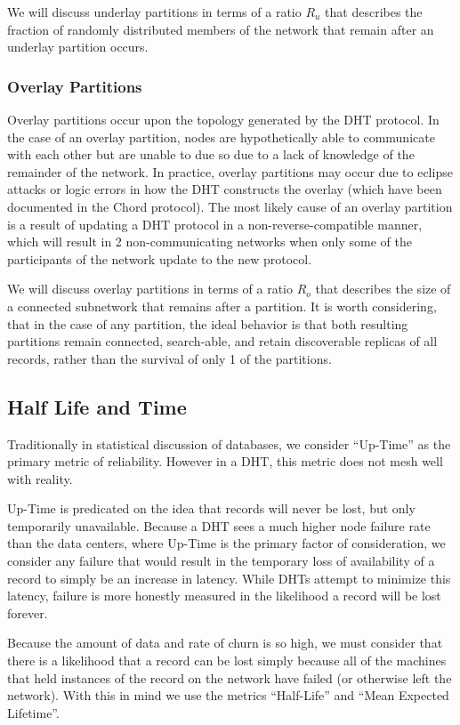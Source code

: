 We will discuss underlay partitions in terms of a ratio $R_{u}$ that describes the fraction of randomly distributed members of the network that remain after an underlay partition occurs. 

\subsubsection{Overlay Partitions}
Overlay partitions occur upon the topology generated by the DHT protocol. 
In the case of an overlay partition, nodes are hypothetically able to communicate with each other but are unable to due so due to a lack of knowledge of the remainder of the network.
In practice, overlay partitions may occur due to eclipse attacks \cite{dhtsec} or logic errors in how the DHT constructs the overlay (which have been documented in the Chord protocol).
The most likely cause of an overlay partition is a result of updating a DHT protocol in a non-reverse-compatible manner, which will result in 2 non-communicating networks when only some of the participants of the network update to the new protocol.

We will discuss overlay partitions in terms of a ratio $R_{o}$ that describes the size of a connected subnetwork that remains after a partition.
It is worth considering, that in the case of any partition, the ideal behavior is that both resulting partitions remain connected, search-able, and retain discoverable replicas of all records, rather than the survival of only 1 of the partitions.

\subsection{Half Life and Time}
Traditionally in statistical discussion of databases, we consider ``Up-Time'' as the primary metric of reliability.
However in a DHT, this metric does not mesh well with reality.

Up-Time is predicated on the idea that records will never be lost, but only temporarily unavailable.
Because a DHT sees a much higher node failure rate than the data centers, where Up-Time is the primary factor of consideration, we consider any failure that would result in the temporary loss of availability of a record to simply be an increase in latency.
While DHTs attempt to minimize this latency, failure is more honestly measured in the likelihood a record will be lost forever.

Because the amount of data and rate of churn is so high, we must consider that there is a likelihood that a record can be lost simply because all of the machines that held instances of the record on the network have failed (or otherwise left the network).
With this in mind we use the metrics ``Half-Life'' and ``Mean Expected Lifetime''.

